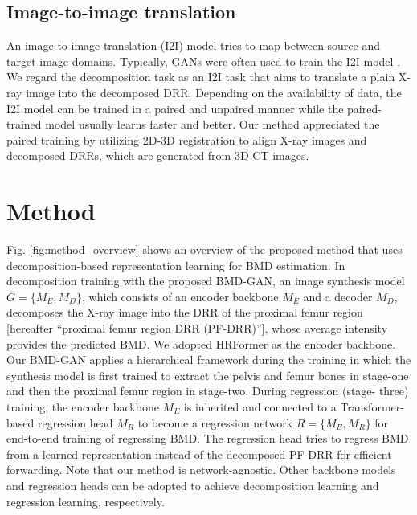 \documentclass[times,twocolumn,final]{elsarticle}
\begin{document}
\subsection{Image-to-image translation}
An image-to-image translation (I2I) model tries to map between source and target image domains. 
Typically, GANs were often used to train the I2I model \citep{isola_image--image_2017,zhu_unpaired_2017,wang_high-resolution_2018}.
We regard the decomposition task as an I2I task that aims to translate a plain X-ray image into the decomposed DRR.
Depending on the availability of data, the I2I model can be trained in a paired \citep{isola_image--image_2017} and unpaired \citep{zhu_unpaired_2017} manner while the paired-trained model usually learns faster and better.
Our method appreciated the paired training by utilizing 2D-3D registration \citep{otake_intraoperative_2012} to align X-ray images and decomposed DRRs, which are generated from 3D CT images.

\section{Method}
Fig. \ref{fig:method_overview} shows an overview of the proposed method that uses decomposition-based representation learning for BMD estimation. 
In decomposition training with the proposed BMD-GAN, an image synthesis model $G=\{M_E,M_D\}$, which consists of an encoder backbone $M_E$ and a decoder $M_D$, decomposes the X-ray image into the DRR of the proximal femur region [hereafter ``proximal femur region DRR (PF-DRR)''], whose average intensity provides the predicted BMD. 
We adopted HRFormer \citep{yuan_hrformer_2021} as the encoder backbone. 
Our BMD-GAN applies a hierarchical framework during the training in which the synthesis model is first trained to extract the pelvis and femur bones in stage-one and then the proximal femur region in stage-two. 
During regression (stage- three) training, the encoder backbone $M_E$ is inherited and connected to a Transformer-based regression head $M_R$ to become a regression network $R=\{M_E,M_R\}$ for end-to-end training of regressing BMD.
The regression head tries to regress BMD from a learned representation instead of the decomposed PF-DRR for efficient forwarding.
Note that our method is network-agnostic. Other backbone models and regression heads can be adopted to achieve decomposition learning and regression learning, respectively.
\end{document}
